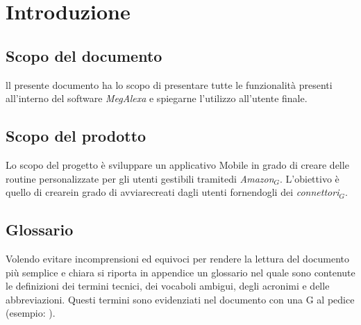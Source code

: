 \chapter{Introduzione}
\label{Introduzione}

\section{Scopo del documento}
ll presente documento ha lo scopo di presentare tutte le funzionalità presenti all'interno del software \textit{MegAlexa} e spiegarne l'utilizzo all'utente finale.

\section{Scopo del prodotto}
Lo scopo del progetto è sviluppare un applicativo Mobile in grado di creare delle routine personalizzate per gli utenti gestibili tramitedi \textit{Amazon$_{G}$}. L’obiettivo è quello di crearein grado di avviarecreati dagli utenti fornendogli dei \textit{connettori$_{G}$}.


\section{Glossario}
Volendo evitare incomprensioni ed equivoci per rendere la lettura del documento più semplice
e chiara si riporta in appendice un glossario nel quale sono contenute le definizioni dei
termini tecnici, dei vocaboli ambigui, degli acronimi e delle abbreviazioni. Questi termini
sono evidenziati nel documento con una G al pedice (esempio: ).
